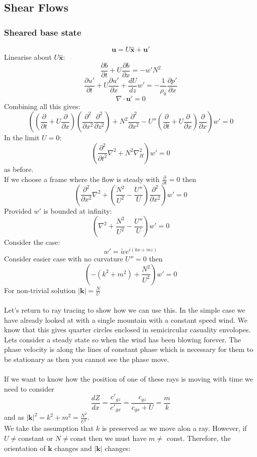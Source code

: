 \documentclass{article}
\begin{document}
\subsection{Shear Flows}
\subsubsection{Sheared base state}
$$
\bm u = U \hat{\bm x} + \bm u'
$$
Linearise about $U\hat{\bm x}$:
$$
\frac{\partial b}{\partial t} + U \frac{\partial b}{\partial x}  = - w' N^2
$$
$$
\frac{\partial u'}{\partial t} + U \frac{\partial u'}{\partial x} + \frac{dU}{dz} w' = - \frac{1}{\rho_0} \frac{\partial p'}{\partial x}
$$
$$
\nabla \cdot \bm u'=0
$$
Combining all this gives:
$$
\left( ( \frac{\partial}{\partial t} + U \frac{\partial}{\partial x}) ( \frac{\partial^2}{\partial x^2} \frac{\partial ^2}{\partial z^2}) + N^2 \frac{\partial^2}{\partial x^2} - U'' ( \frac{\partial}{\partial t} + U \frac{\partial}{\partial x}) \frac{\partial }{\partial x} \right) w' = 0
$$
In the limit $U = 0$:
$$
( \frac{\partial^2}{\partial t^2} \nabla^2 + N^2 \nabla_H^2 ) w' = 0
$$
as before. \\
If we choose a frame where the flow is steady with $\frac{\partial}{\partial t} = 0$ then
$$
(\frac{\partial^2}{\partial x^2} \nabla^2 + ( \frac{N^2}{U^2} - \frac{U''}{U}) \frac{\partial ^2}{\partial x^2} ) w' = 0
$$
Provided $w'$ is bounded at infinity:
$$
(\nabla^2 + \frac{N^2}{U^2} - \frac{U''}{U}) w' = 0
$$
Consider the case:
$$
w' = \tilde w e^{i(kx + mz)}
$$
Consider easier case with no curvature $U'' = 0$ then
$$
( - (k^2 + m^2) + \frac{N^2}{U^2}) w' = 0
$$
For non-trivial solution $|\bm k| = \frac{N}{U}$ \\\\
Let's return to ray tracing to show how we can use this. In the simple case we have already looked at with a single mountain with a constant speed wind. We know that this gives quarter circles enclosed in semicircular casuality envolopes. Lets consider a steady state so when the wind has been blowing forever. The phase velocity is along the lines of constant phase which is necessary for them to be stationary as then you cannot see the phase move.\\\\
If we want to know how the position of one of these rays is moving with time we need to consider
$$
\frac{dZ}{dx} = \frac{c'_{gz}}{c'_{gx}} = \frac{c_{gz}}{c_{gx} + U} = \frac{m}{k}
$$
and as $|\bm k|^2 = k^2 + m^2 = \frac{N^2}{U^2}$.\\
We take the assumption that $k$ is preserved as we move alon a ray. However, if $U \neq $constant or $N \neq $const then we must have $m \neq$ const. Therefore, the orientation of $\bm k$ changes and $|\bm k|$ changes:
\end{document}
